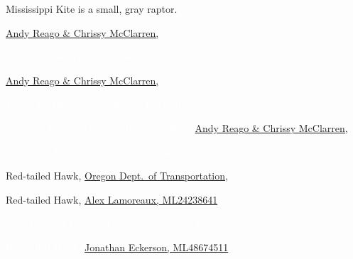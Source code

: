 \documentclass[t]{beamer}
\begin{document}
{
\begin{frame}{Mississippi Kite is a small, gray raptor.}


\tinyfill \textcolor{white}{\href{https://flickr.com/photos/wildreturn/28138609132}{Andy Reago \& Chrissy McClarren, }}
\end{frame}
}

{
\begin{frame}{\textcolor{white}{Mississippi Kite feeds on insects in the air.}}


\tinyfill \textcolor{white}{\href{https://flickr.com/photos/wildreturn/28138609132}{Andy Reago \& Chrissy McClarren, }}
\end{frame}
}


{
\begin{frame}{\textcolor{white}{Watch for the white patches on top of the wings.}}


\tinyfill \textcolor{white}{Common Grackle chasing Mississippi Kite, \href{https://flickr.com/photos/wildreturn/28138609132}{Andy Reago \& Chrissy McClarren, }}
\end{frame}
}

{
\begin{frame}{\textcolor{white}{Red-tailed Hawk is our largest “buteo.”}}


\tinyfill Red-tailed Hawk, \href{https://flickr.com/photos/oregondot/5396663758}{Oregon Dept.~of Transportation, }
\end{frame}
}

{
\begin{frame}


\tinyfill Red-tailed Hawk, \href{https://macaulaylibrary.org/asset/24238641}{Alex Lamoreaux, ML24238641}
\end{frame}
}


{
\begin{frame}{\textcolor{white}{Note the dark head and leading wing edge, light breast.}}


\tinyfill \textcolor{white}{Red-tailed Hawk, \href{https://macaulaylibrary.org/asset/48674511}{Jonathan Eckerson, ML48674511}}
\end{frame}
}
\end{document}
